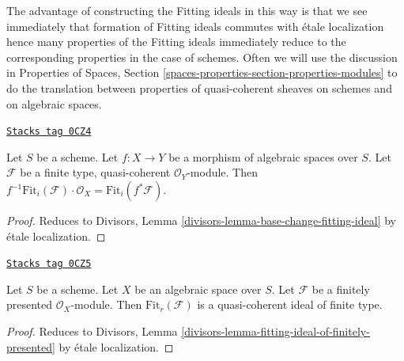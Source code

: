 \medskip\noindent
The advantage of constructing the Fitting ideals in this way
is that we see immediately that formation of Fitting ideals
commutes with \'etale localization hence many properties of
the Fitting ideals immediately reduce to the corresponding
properties in the case of schemes. Often we will use the
discussion in Properties of Spaces, Section
\ref{spaces-properties-section-properties-modules}
to do the translation between properties of quasi-coherent sheaves
on schemes and on algebraic spaces.

\begin{lemma}
\label{spaces-divisors-lemma-base-change-fitting-ideal}
\href{https://stacks.math.columbia.edu/tag/0CZ4}{\texttt{Stacks tag 0CZ4}}

Let $S$ be a scheme.
Let $f : X \to Y$ be a morphism of algebraic spaces over $S$.
Let $\mathcal{F}$ be a finite type, quasi-coherent $\mathcal{O}_Y$-module.
Then
$f^{-1}\text{Fit}_i(\mathcal{F}) \cdot \mathcal{O}_X =
\text{Fit}_i(f^*\mathcal{F})$.
\end{lemma}

\begin{proof}
Reduces to
Divisors, Lemma \ref{divisors-lemma-base-change-fitting-ideal}
by \'etale localization.
\end{proof}

\begin{lemma}
\label{spaces-divisors-lemma-fitting-ideal-of-finitely-presented}
\href{https://stacks.math.columbia.edu/tag/0CZ5}{\texttt{Stacks tag 0CZ5}}

Let $S$ be a scheme. Let $X$ be an algebraic space over $S$.
Let $\mathcal{F}$ be a finitely presented $\mathcal{O}_X$-module.
Then $\text{Fit}_r(\mathcal{F})$ is a quasi-coherent ideal of finite type.
\end{lemma}

\begin{proof}
Reduces to
Divisors, Lemma \ref{divisors-lemma-fitting-ideal-of-finitely-presented}
by \'etale localization.
\end{proof}

